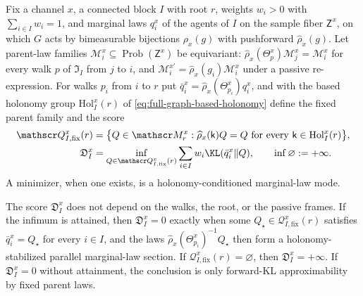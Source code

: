 Fix a channel $x$, a connected block $I$ with root $r$, weights $w_i>0$ with $\sum_{i\in I}w_i=1$, and
marginal laws $q^x_i$ of the agents of $I$ on the sample fiber $\mathsf Z^x$, on which $G$ acts by
bimeasurable bijections $\rho_x(g)$ with pushforward $\widehat\rho_x(g)$. Let parent-law families
$\mathscr M^x_i\subseteq\operatorname{Prob}(\mathsf Z^x)$ be equivariant:
$\widehat\rho_x(\Theta^x_p)\mathscr M^x_j=\mathscr M^x_i$ for every walk $p$ of $\mathfrak I_I$ from $j$ to
$i$, and $\mathscr M^{x\prime}_i=\widehat\rho_x(g_i)\mathscr M^x_i$ under a passive re-expression. For walks
$p_i$ from $i$ to $r$ put $\bar q^x_i=\widehat\rho_x(\Theta^x_{p_i})q^x_i$, and with the based holonomy
group $\mathrm{Hol}^x_I(r)$ of \eqref{eq:full-graph-based-holonomy} define the fixed parent family and the
score
\begin{align}
\mathscr Q^x_{I,\mathrm{fix}}(r)&=\bigl\{Q\in\mathscr M^x_r:\widehat\rho_x(\mathsf k)Q=Q
\text{ for every }\mathsf k\in\mathrm{Hol}^x_I(r)\bigr\},
\label{eq:cg-holonomy-fixed-parent}\\
\mathfrak D^x_I&=\inf_{Q\in\mathscr Q^x_{I,\mathrm{fix}}(r)}\sum_{i\in I}w_i\KL(\bar q^x_i\Vert Q),
\qquad\inf\varnothing:=+\infty.
\label{eq:cg-holonomy-kl-score}
\end{align}
A minimizer, when one exists, is a holonomy-conditioned marginal-law mode.

The score $\mathfrak D^x_I$ does not depend on the walks, the root, or the passive frames. If the infimum
is attained, then $\mathfrak D^x_I=0$ exactly when some $Q_\star\in\mathscr Q^x_{I,\mathrm{fix}}(r)$
satisfies $\bar q^x_i=Q_\star$ for every $i\in I$, and the laws $\widehat\rho_x(\Theta^x_{p_i})^{-1}Q_\star$
then form a holonomy-stabilized parallel marginal-law section. If $\mathscr Q^x_{I,\mathrm{fix}}(r)=\varnothing$,
then $\mathfrak D^x_I=+\infty$. If $\mathfrak D^x_I=0$ without attainment, the conclusion is only forward-KL
approximability by fixed parent laws. 

